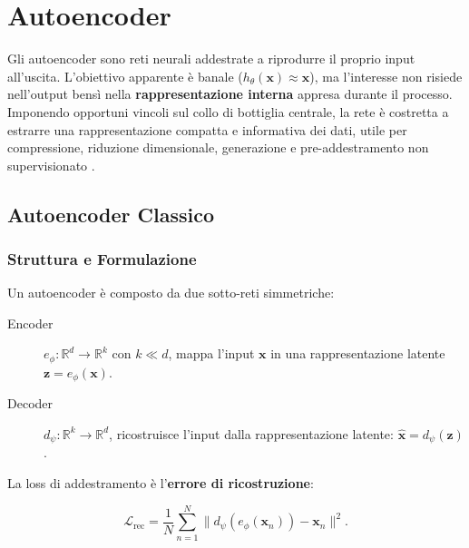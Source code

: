 \chapter{Autoencoder}
\label{ch:autoencoders}

Gli autoencoder sono reti neurali addestrate a riprodurre il proprio input
all'uscita. L'obiettivo apparente è banale ($h_\theta(\mathbf{x}) \approx
\mathbf{x}$), ma l'interesse non risiede nell'output bensì nella
\textbf{rappresentazione interna} appresa durante il processo. Imponendo
opportuni vincoli sul collo di bottiglia centrale, la rete è costretta a
estrarre una rappresentazione compatta e informativa dei dati,
utile per compressione, riduzione dimensionale, generazione e
pre-addestramento non supervisionato \citep{bishop2024}.

\section{Autoencoder Classico}
\label{sec:ae-classic}

\subsection{Struttura e Formulazione}
\label{subsec:ae-structure}

Un autoencoder è composto da due sotto-reti simmetriche:

\begin{description}
  \item[Encoder] $e_\phi : \mathbb{R}^d \to \mathbb{R}^k$ con $k \ll d$,
        mappa l'input $\mathbf{x}$ in una rappresentazione latente
        $\mathbf{z} = e_\phi(\mathbf{x})$.
  \item[Decoder] $d_\psi : \mathbb{R}^k \to \mathbb{R}^d$, ricostruisce
        l'input dalla rappresentazione latente: $\hat{\mathbf{x}} =
        d_\psi(\mathbf{z})$.
\end{description}

La loss di addestramento è l'\textbf{errore di ricostruzione}:

\begin{equation}
  \mathcal{L}_{\text{rec}} = \frac{1}{N}\sum_{n=1}^{N}
    \bigl\|d_\psi(e_\phi(\mathbf{x}_n)) - \mathbf{x}_n\bigr\|^2.
  \label{eq:ae-rec-loss}
\end{equation}

